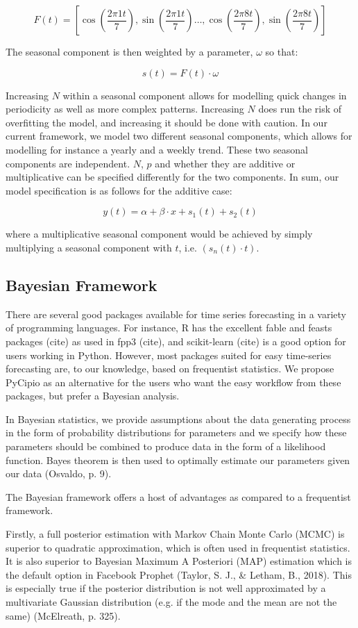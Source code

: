 \documentclass{article}
\begin{document}
$$F(t) = \left[ \cos(\frac{2 \pi 1 t}{7}), \sin(\frac{2 \pi 1 t}{7}) \dots, \cos(\frac{2 \pi 8 t}{7}), \sin(\frac{2 \pi 8 t}{7}) \right]$$

The seasonal component is then weighted by a parameter, $\omega$ so that:

$$s(t) = F(t) \cdot \omega$$

Increasing $N$ within a seasonal component allows for modelling quick changes in periodicity as well as more complex patterns. Increasing $N$ does run the risk of overfitting the model, and increasing it should be done with caution. In our current framework, we model two different seasonal components, which allows for modelling for instance a yearly and a weekly trend. These two seasonal components are independent. $N$, $p$ and whether they are additive or multiplicative can be specified differently for the two components. In sum, our model specification is as follows for the additive case:

$$y(t) = \alpha + \beta \cdot x + s_1(t) + s_2(t)$$

where a multiplicative seasonal component would be achieved by simply multiplying a seasonal component with $t$, i.e. $(s_n(t) \cdot t)$.


\subsection{Bayesian Framework}

There are several good packages available for time series forecasting in a variety of programming languages. For instance, R has the excellent fable and feasts packages (cite) as used in fpp3 (cite), and scikit-learn (cite) is a good option for users working in Python. However, most packages suited for easy time-series forecasting are, to our knowledge, based on frequentist statistics. We propose PyCipio as an alternative for the users who want the easy workflow from these packages, but prefer a Bayesian analysis.   

In Bayesian statistics, we provide assumptions about the data generating process in the form of probability distributions for parameters and we specify how these parameters should be combined to produce data in the form of a likelihood function. Bayes theorem is then used to optimally estimate our parameters given our data (Osvaldo, p. 9).

The Bayesian framework offers a host of advantages as compared to a frequentist framework.

Firstly, a full posterior estimation with Markov Chain Monte Carlo (MCMC) is superior to quadratic approximation, which is often used in frequentist statistics. It is also superior to Bayesian Maximum A Posteriori (MAP) estimation which is the default option in Facebook Prophet (Taylor, S. J., \& Letham, B., 2018). This is especially true if the posterior distribution is not well approximated by a multivariate Gaussian distribution (e.g. if the mode and the mean are not the same) (McElreath, p. 325).
\end{document}
